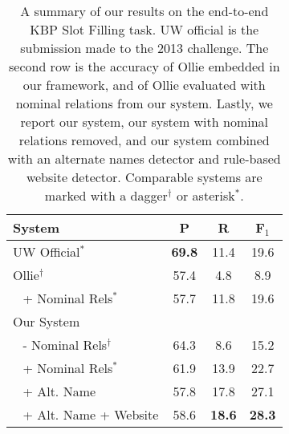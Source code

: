 \begin{table}
\begin{center}
\begin{tabular}{lccc}
\hline
\textbf{System}                & \textbf{P}    & \textbf{R}    & \textbf{F$_1$} \\
\hline
UW Official$^*$                & \textbf{69.8} & 11.4          & 19.6 \\
\hline
Ollie$^\dagger$                & 57.4          & 4.8           & 8.9  \\
$~~$ + Nominal Rels$^*$        & 57.7          & 11.8          & 19.6 \\
\hline
Our System                     & ~~~~          & ~~~           & ~~~  \\
$~~$ - Nominal Rels$^\dagger$  & 64.3          & 8.6           & 15.2 \\
$~~$ + Nominal Rels$^*$        & 61.9          & 13.9          & 22.7 \\
$~~$ + Alt. Name               & 57.8          & 17.8          & 27.1 \\
$~~$ + Alt. Name + Website     & 58.6          & \textbf{18.6} & \textbf{28.3} \\
\hline
\end{tabular}
\end{center}
\caption{\label{tab:results}
A summary of our results on the end-to-end KBP Slot Filling task.
UW official is the submission made to the 2013 challenge.
The second row is the accuracy of Ollie embedded in our framework,
  and of Ollie evaluated with nominal relations from our system.
Lastly, we report our system, our system with nominal relations removed,
  and our system combined with an alternate names detector and rule-based
  website detector.
Comparable systems are marked with a dagger$^\dagger$ or  asterisk$^*$.
}
\end{table}

